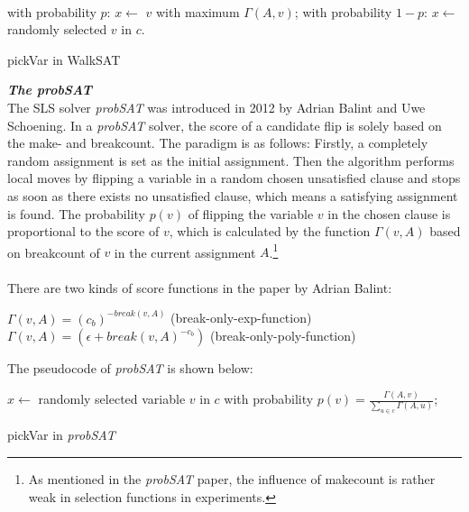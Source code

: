 \documentclass[12pt,a4paper,twoside]{scrartcl}
\numberwithin{equation}{section}
\begin{document}
\\
\begin{algorithm}[H]
  with probability $p$: $x \leftarrow$   $v$ with maximum $\Gamma(A,v)$; \;
  with probability $1-p$:  $x \leftarrow$  randomly selected $v$ in $c$. 
 \caption{pickVar in WalkSAT}
\end{algorithm}  

\emph{\textbf{The probSAT}}\\
The SLS solver \emph{probSAT} was introduced in 2012 by Adrian Balint and Uwe Schoening\cite{balint2016engineering}. In a \emph{probSAT} solver, the score of a candidate flip is solely based on the make- and breakcount. The paradigm is as follows: Firstly, a completely random assignment is set as the initial assignment. Then the algorithm performs local moves by flipping a variable in a random chosen unsatisfied clause and stops as soon as there exists no unsatisfied clause, which means a satisfying assignment is found. The probability $p(v)$ of flipping the variable $v$ in the chosen clause is proportional to the score of $v$, which is calculated by the function $\Gamma(v,A)$ based on breakcount of $v$ in the current assignment $A$.\footnote{As mentioned in the \emph{probSAT} paper, the influence of makecount is rather weak in selection functions in experiments.} 
\\
 \\ There are two kinds of score functions in the paper by Adrian Balint: \\
\begin{center}
$\Gamma(v,A) = (c_b)^{-break(v,A)}$ (break-only-exp-function) \\
$\Gamma(v,A)=(\epsilon +break(v,A)^{-c_b})$  (break-only-poly-function)\\
\end{center} 
\clearpage
The pseudocode of \emph{probSAT} is shown below:\\
\begin{algorithm}[H]
  $x \leftarrow$ randomly selected  variable $v$ in $c$ with probability $p(v) =\frac{\Gamma(A,v)}{\sum_{u \in c}\Gamma(A,u)}$; 
 \caption{pickVar in \emph{probSAT}}
\end{algorithm} 
\end{document}

